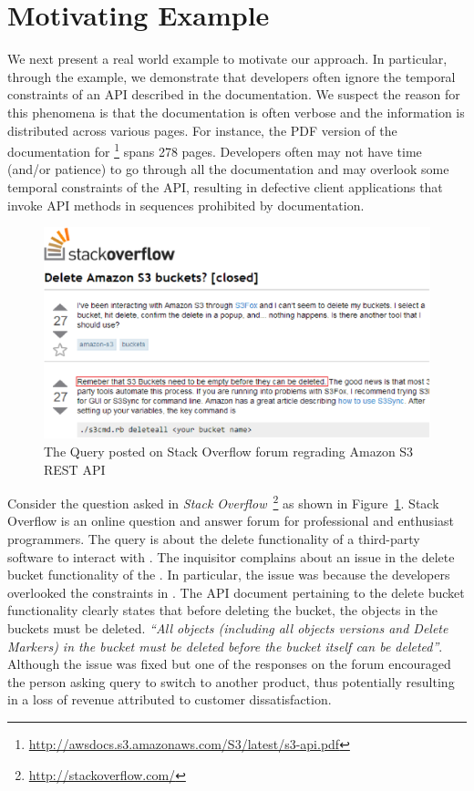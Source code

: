 \section{Motivating Example}
\label{sec:example}

We next present a real world example to motivate our approach.
In particular, through the example, we demonstrate that developers often ignore the temporal constraints of an API described in the documentation.
We suspect the reason for this phenomena is that the documentation is often verbose and the information is distributed across various pages.
For instance, the PDF version of the documentation for \amazonAPI\footnote{\url{http://awsdocs.s3.amazonaws.com/S3/latest/s3-api.pdf}} spans 278 pages.
Developers often may not have time (and/or patience) to go through all the documentation and may overlook some temporal constraints of the API,
resulting in defective client applications that invoke API methods in sequences prohibited by documentation. 

\begin{figure}[t]
\begin{center}
\includegraphics[scale=0.45]{Stackoverflow.eps}
\end{center}
\caption{\label{fig:Stackoverflow} The Query posted on Stack Overflow forum regrading Amazon S3 REST API}
\end{figure}

Consider the question asked in \textit{Stack Overflow}~\footnote{\url{http://stackoverflow.com/}} as shown in Figure~\ref{fig:Stackoverflow}.
Stack Overflow is an online question and answer forum for professional and enthusiast programmers.
The query is about the delete functionality of a third-party software  to interact with \amazonAPI.
The inquisitor complains about an issue in the delete bucket functionality of the .
In particular, the issue was because the  developers overlooked the constraints in \amazon.
The API document pertaining to the  delete bucket functionality clearly states that before deleting the bucket, the objects in the buckets must be deleted.
\textit{``All objects (including all objects versions and Delete Markers) in the bucket must be deleted before the bucket itself can be deleted''}.
Although the issue was fixed but one of the responses on the forum encouraged the person asking query to switch to another product,
thus potentially resulting in a loss of revenue attributed to customer dissatisfaction.
 
